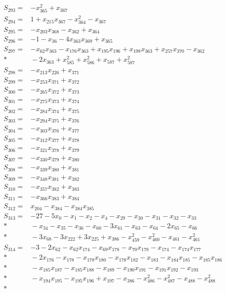 \begin{align*}
S_{293}={}&-x_{365}^{2}+x_{367}\\[3pt]
S_{294}={}&1+x_{215}x_{367}-x_{364}^{2}-x_{367}\\[3pt]
S_{295}={}&-x_{203}x_{368}-x_{362}+x_{364}\\[3pt]
S_{296}={}&-1-x_{36}-4x_{363}x_{369}+x_{365}\\[3pt]
S_{297}={}&-x_{62}x_{363}-x_{176}x_{363}+x_{195}x_{196}+x_{198}x_{363}+x_{257}x_{370}-x_{362}\\*
&{}-2x_{363}+x_{585}^{2}+x_{586}^{2}+x_{587}+x_{587}^{2}\\[3pt]
S_{298}={}&-x_{213}x_{226}+x_{371}\\[3pt]
S_{299}={}&-x_{253}x_{371}+x_{372}\\[3pt]
S_{300}={}&-x_{265}x_{372}+x_{373}\\[3pt]
S_{301}={}&-x_{275}x_{373}+x_{374}\\[3pt]
S_{302}={}&-x_{284}x_{374}+x_{375}\\[3pt]
S_{303}={}&-x_{294}x_{375}+x_{376}\\[3pt]
S_{304}={}&-x_{303}x_{376}+x_{377}\\[3pt]
S_{305}={}&-x_{312}x_{377}+x_{378}\\[3pt]
S_{306}={}&-x_{321}x_{378}+x_{379}\\[3pt]
S_{307}={}&-x_{330}x_{379}+x_{380}\\[3pt]
S_{308}={}&-x_{339}x_{380}+x_{381}\\[3pt]
S_{309}={}&-x_{348}x_{381}+x_{382}\\[3pt]
S_{310}={}&-x_{357}x_{382}+x_{383}\\[3pt]
S_{311}={}&-x_{366}x_{383}+x_{384}\\[3pt]
S_{312}={}&x_{204}-x_{384}-x_{384}x_{385}\\[3pt]
S_{313}={}&-27-5x_{0}-x_{1}-x_{2}-x_{4}-x_{29}-x_{30}-x_{31}-x_{32}-x_{33}\\*
&{}-x_{34}-x_{35}-x_{36}-x_{60}-3x_{61}-x_{63}-x_{64}-2x_{65}-x_{66}\\*
&{}-3x_{68}-3x_{222}+3x_{225}+x_{386}-x_{459}^{2}-x_{460}^{2}-x_{461}-x_{461}^{2}\\[3pt]
S_{314}={}&-3-2x_{62}-x_{62}x_{174}-x_{69}x_{178}-x_{70}x_{178}-x_{174}-x_{174}x_{177}\\*
&{}-2x_{176}-x_{178}-x_{178}x_{180}-x_{178}x_{182}-x_{183}-x_{184}x_{185}-x_{185}x_{186}\\*
&{}-x_{185}x_{187}-x_{185}x_{188}-x_{189}-x_{190}x_{191}-x_{191}x_{192}-x_{193}\\*
&{}-x_{194}x_{195}-x_{195}x_{196}+x_{197}-x_{386}-x_{486}^{2}-x_{487}^{2}-x_{488}-x_{488}^{2}\\*

\end{align*}
